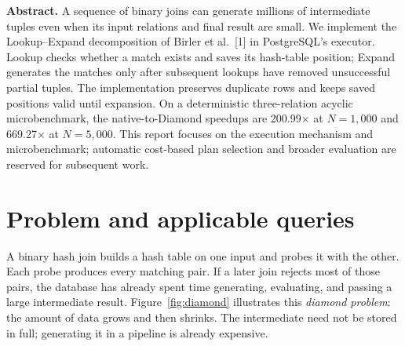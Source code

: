 \documentclass[10pt,twocolumn]{article}
\begin{document}

\noindent\textbf{Abstract.}
A sequence of binary joins can generate millions of intermediate tuples even
when its input relations and final result are small. We implement the
Lookup--Expand decomposition of Birler et al.~[1] in PostgreSQL's executor.
Lookup checks whether a match exists and saves its hash-table position; Expand
generates the matches only after subsequent lookups have removed unsuccessful
partial tuples. The implementation preserves duplicate rows and keeps saved
positions valid until expansion. On a deterministic three-relation acyclic
microbenchmark, the native-to-Diamond speedups are 200.99$\times$ at
$N=1{,}000$ and 669.27$\times$ at $N=5{,}000$. This report focuses on the execution
mechanism and microbenchmark; automatic cost-based plan selection and broader
evaluation are reserved for subsequent work.

\section{Problem and applicable queries}
A binary hash join builds a hash table on one input and probes it with the
other. Each probe produces every matching pair. If a later join rejects most
of those pairs, the database has already spent time generating, evaluating,
and passing a large intermediate result. Figure~\ref{fig:diamond} illustrates
this \emph{diamond problem}: the amount of data grows and then shrinks.
The intermediate need not be stored in full; generating it in a pipeline is
already expensive.
\end{document}
